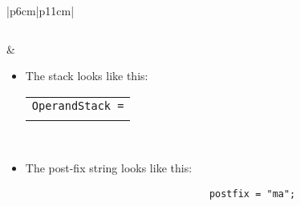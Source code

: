 \begin{center}
\begin{longtable}{ |p{6cm}|p{11cm}| }
{\begin{verbatim}
                \end{verbatim}
            }
            &  
                \begin{itemize}
                    \item The stack looks like this: 
                        {
                        \begin{center}
                            \begin{tabular}{ c }
                                \texttt{OperandStack =} \\ \\
                            \end{tabular}
                            \begin{bytefield}{10}
                                 \\
                            \end{bytefield}
                        \end{center}
                        }
                    
                    \item The post-fix string looks like this: 
                        {
                            \begin{verbatim}
                                postfix = "ma";
                            \end{verbatim}
                        }
                \end{itemize}
            \\
        \hline
        \hline
             \\
        

\end{longtable}
\end{center}

